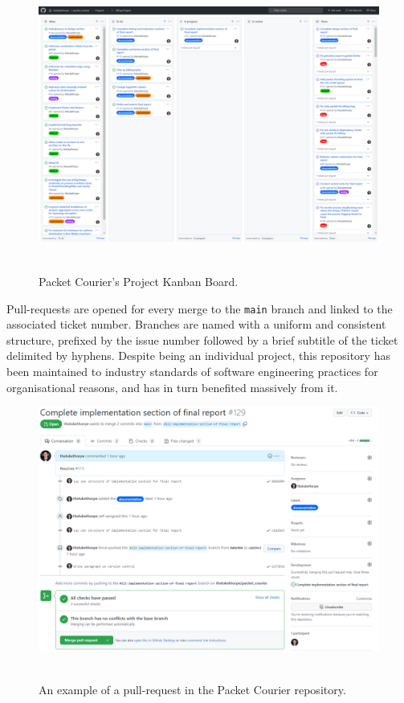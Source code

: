 \begin{figure}[!h]
    \includegraphics[width=\textwidth]{images/chapter_4_implementation/github_kanban_board}
    \centering~\caption{Packet Courier's Project Kanban Board\cite{packet_courier}.}
    \label{fig:chapter_4_implementation-github_kanban_board}
\end{figure}

Pull-requests are opened for every merge to the \texttt{main} branch and linked to the associated ticket number.
Branches are named with a uniform and consistent structure, prefixed by the issue number followed by a brief subtitle
of the ticket delimited by hyphens. Despite being an individual project, this repository has been maintained to
industry standards of software engineering practices for organisational reasons, and has in turn benefited massively
from it.

\begin{figure}[!h]
    \includegraphics[width=\textwidth]{images/chapter_4_implementation/github_pull_request}
    \centering~\caption{An example of a pull-request in the Packet Courier repository\cite{packet_courier}.}
    \label{fig:chapter_4_implementation-github_pull_request}
\end{figure}

